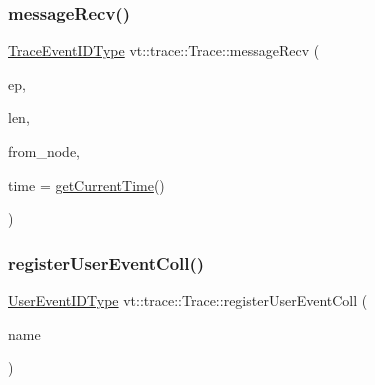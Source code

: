 \mbox{\label{structvt_1_1trace_1_1_trace_aa14d58fb03a226e213f72bb03a13bb9f}} 
\subsubsection{\texorpdfstring{message\+Recv()}{messageRecv()}}
{\footnotesize\ttfamily \hyperlink{namespacevt_1_1trace_a64a7185f3e102df8d8258f263ccd1582}{Trace\+Event\+I\+D\+Type} vt\+::trace\+::\+Trace\+::message\+Recv (\begin{DoxyParamCaption}\item[{\hyperlink{namespacevt_1_1trace_a3c14050715ba9eceaeff51fb3de64f2f}{Trace\+Entry\+I\+D\+Type} const}]{ep,  }\item[{\hyperlink{namespacevt_1_1trace_aeb598f45d67d41db7902e494f2f0ce59}{Trace\+Msg\+Len\+Type} const}]{len,  }\item[{\hyperlink{namespacevt_a866da9d0efc19c0a1ce79e9e492f47e2}{Node\+Type} const}]{from\+\_\+node,  }\item[{double const}]{time = {\ttfamily \hyperlink{structvt_1_1trace_1_1_trace_a04cf6b76b4ced1bc90d246a34c948db5}{get\+Current\+Time}()} }\end{DoxyParamCaption})}

\mbox{\label{structvt_1_1trace_1_1_trace_a9a106f7f39e605745994d20bb526f8cf}} 
\subsubsection{\texorpdfstring{register\+User\+Event\+Coll()}{registerUserEventColl()}}
{\footnotesize\ttfamily \hyperlink{namespacevt_1_1trace_a5908920d051c144c89f17c69ed262350}{User\+Event\+I\+D\+Type} vt\+::trace\+::\+Trace\+::register\+User\+Event\+Coll (\begin{DoxyParamCaption}\item[{std\+::string const \&}]{name }\end{DoxyParamCaption})}

\mbox{\label{structvt_1_1trace_1_1_trace_a1b80a8ca6bebbfbe61f8b119342e14f7}} 
